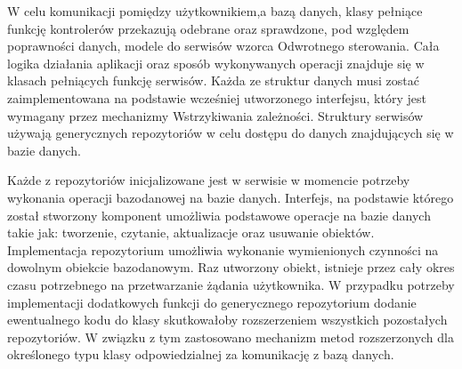 {W celu komunikacji pomiędzy użytkownikiem,a bazą danych, klasy pełniące funkcję kontrolerów przekazują odebrane oraz sprawdzone, pod względem poprawności danych, modele do serwisów wzorca Odwrotnego sterowania. Cała logika działania aplikacji oraz sposób wykonywanych operacji znajduje się w klasach pełniących funkcję serwisów.
 Każda ze struktur danych musi zostać zaimplementowana na podstawie wcześniej utworzonego interfejsu, który jest wymagany przez mechanizmy Wstrzykiwania zależności. Struktury serwisów używają generycznych repozytoriów w celu dostępu do danych znajdujących się w bazie danych. 
 
 Każde z repozytoriów inicjalizowane jest w serwisie w momencie potrzeby wykonania operacji bazodanowej na bazie danych. Interfejs, na podstawie którego został stworzony komponent umożliwia podstawowe operacje na bazie danych takie jak: tworzenie, czytanie, aktualizacje oraz usuwanie obiektów. Implementacja repozytorium umożliwia wykonanie wymienionych czynności na dowolnym obiekcie bazodanowym. Raz utworzony obiekt, istnieje przez cały okres czasu potrzebnego na przetwarzanie żądania użytkownika. W przypadku potrzeby implementacji dodatkowych funkcji do generycznego repozytorium dodanie ewentualnego kodu do klasy skutkowałoby rozszerzeniem wszystkich pozostałych repozytoriów. W związku z tym zastosowano mechanizm metod rozszerzonych dla określonego typu klasy odpowiedzialnej za komunikację z bazą danych. }
\\
\begin{center}

\end{center}

